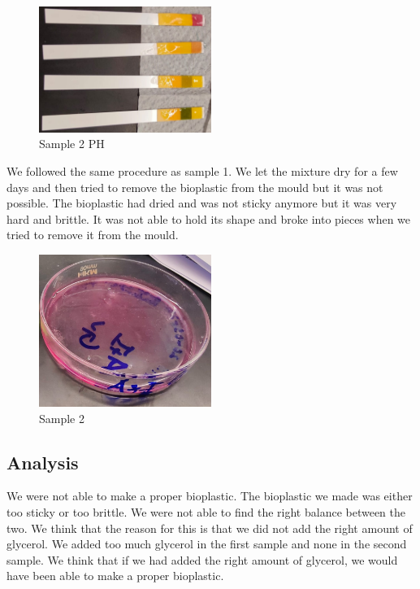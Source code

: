 \documentclass[a4paper, 12pt, english]{article}
\begin{document}
\begin{figure}[H]
	\centering
	\includegraphics[width=0.5\textwidth]{images/sample2-ph.jpg}
	\caption{Sample 2 PH}
	\label{fig:sample2-ph}
\end{figure}

We followed the same procedure as sample 1. We let the mixture dry for a few
days and then tried to remove the bioplastic from the mould but it was not
possible. The bioplastic had dried and was not sticky anymore but it was very
hard and brittle. It was not able to hold its shape and broke into pieces when
we tried to remove it from the mould.

\begin{figure}[H]
	\centering
	\includegraphics[width=0.5\textwidth]{images/sample2.jpg}
	\caption{Sample 2}
	\label{fig:sample2}
\end{figure}

\subsection{Analysis}
We were not able to make a proper bioplastic. The bioplastic we made was either
too sticky or too brittle. We were not able to find the right balance between
the two. We think that the reason for this is that we did not add the right
amount of glycerol. We added too much glycerol in the first sample and none in
the second sample. We think that if we had added the right amount of glycerol,
we would have been able to make a proper bioplastic.
\end{document}
